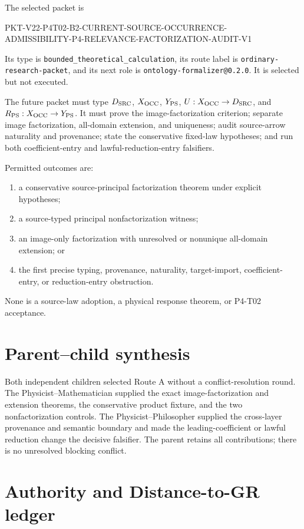 \documentclass[11pt]{article}
\begin{document}
The selected packet is
\begin{center}
\small\ttfamily
PKT-V22-P4T02-B2-CURRENT-SOURCE-OCCURRENCE-\\
ADMISSIBILITY-P4-RELEVANCE-FACTORIZATION-AUDIT-V1
\end{center}
Its type is \texttt{bounded\_theoretical\_calculation}, its route label is
\texttt{ordinary-research-packet}, and its next role is
\texttt{ontology-formalizer@0.2.0}. It is selected but not executed.

The future packet must type $D_{\rm SRC}$, $X_{\rm OCC}$, $Y_{\rm PS}$,
$U:X_{\rm OCC}\to D_{\rm SRC}$, and
$R_{\rm PS}:X_{\rm OCC}\to Y_{\rm PS}$. It must prove the image-factorization
criterion; separate image factorization, all-domain extension, and uniqueness;
audit source-arrow naturality and provenance; state the conservative fixed-law
hypotheses; and run both coefficient-entry and lawful-reduction-entry
falsifiers.

Permitted outcomes are:
\begin{enumerate}
  \item a conservative source-principal factorization theorem under explicit
        hypotheses;
  \item a source-typed principal nonfactorization witness;
  \item an image-only factorization with unresolved or nonunique all-domain
        extension; or
  \item the first precise typing, provenance, naturality, target-import,
        coefficient-entry, or reduction-entry obstruction.
\end{enumerate}
None is a source-law adoption, a physical response theorem, or P4-T02
acceptance.

\section{Parent--child synthesis}

Both independent children selected Route A without a conflict-resolution
round. The Physicist--Mathematician supplied the exact image-factorization and
extension theorems, the conservative product fixture, and the two
nonfactorization controls. The Physicist--Philosopher supplied the cross-layer
provenance and semantic boundary and made the leading-coefficient or lawful
reduction change the decisive falsifier. The parent retains all contributions;
there is no unresolved blocking conflict.

\section{Authority and Distance-to-GR ledger}
\end{document}
